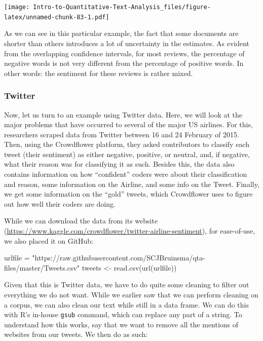 \documentclass[
]{article}
\newenvironment{Shaded}{\begin{snugshade}}{\end{snugshade}}
\newcommand{\FunctionTok}[1]{\textcolor[rgb]{0.00,0.00,0.00}{#1}}
\newcommand{\NormalTok}[1]{#1}
\newcommand{\OtherTok}[1]{\textcolor[rgb]{0.56,0.35,0.01}{#1}}
\newcommand{\StringTok}[1]{\textcolor[rgb]{0.31,0.60,0.02}{#1}}
\begin{document}
\texttt{[image: Intro-to-Quantitative-Text-Analysis\_files/figure-latex/unnamed-chunk-83-1.pdf]}

As we can see in this particular example, the fact that some documents are shorter than others introduces a lot of uncertainty in the estimates. As evident from the overlapping confidence intervals, for most reviews, the percentage of negative words is not very different from the percentage of positive words. In other words: the sentiment for these reviews is rather mixed.

\hypertarget{twitter}{%
\subsubsection{Twitter}\label{twitter}}

Now, let us turn to an example using Twitter data. Here, we will look at the major problems that have occurred to several of the major US airlines. For this, researchers scraped data from Twitter between 16 and 24 February of 2015. Then, using the Crowdflower platform, they asked contributors to classify each tweet (their sentiment) as either negative, positive, or neutral, and, if negative, what their reason was for classifying it as such. Besides this, the data also contains information on how ``confident'' coders were about their classification and reason, some information on the Airline, and some info on the Tweet. Finally, we get some information on the ``gold'' tweets, which Crowdflower uses to figure out how well their coders are doing.

While we can download the data from its website (\url{https://www.kaggle.com/crowdflower/twitter-airline-sentiment}), for ease-of-use, we also placed it on GitHub:

\begin{Shaded}
\begin{Highlighting}[]
\NormalTok{urlfile }\OtherTok{=} \StringTok{"https://raw.githubusercontent.com/SCJBruinsma/qta{-}files/master/Tweets.csv"}
\NormalTok{tweets }\OtherTok{\textless{}{-}} \FunctionTok{read.csv}\NormalTok{(}\FunctionTok{url}\NormalTok{(urlfile))}
\end{Highlighting}
\end{Shaded}

Given that this is Twitter data, we have to do quite some cleaning to filter out everything we do not want. While we earlier saw that we can perform cleaning on a corpus, we can also clean our text while still in a data frame. We can do this with R's in-house \texttt{gsub} command, which can replace any part of a string. To understand how this works, say that we want to remove all the mentions of websites from our tweets. We then do as such:
\end{document}
